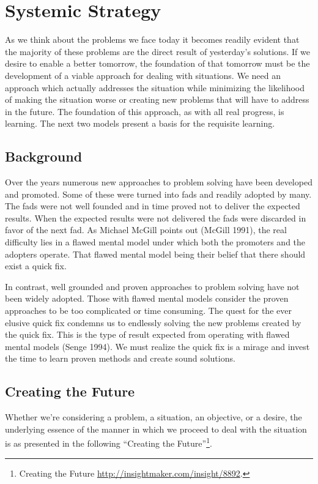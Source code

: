 \documentclass[]{memoir}
\begin{document}
\section{Systemic Strategy}

As we think about the problems we face today it becomes readily evident
that the majority of these problems are the direct result of yesterday's
solutions. If we desire to enable a better tomorrow, the foundation of
that tomorrow must be the development of a viable approach for dealing
with situations. We need an approach which actually addresses the
situation while minimizing the likelihood of making the situation worse
or creating new problems that will have to address in the future. The
foundation of this approach, as with all real progress, is learning. The
next two models present a basis for the requisite learning.

\subsection{Background}

Over the years numerous new approaches to problem solving have been
developed and promoted. Some of these were turned into fads and readily
adopted by many. The fads were not well founded and in time proved not
to deliver the expected results. When the expected results were not
delivered the fads were discarded in favor of the next fad. As Michael
McGill points out (McGill 1991), the real difficulty lies in a flawed
mental model under which both the promoters and the adopters operate.
That flawed mental model being their belief that there should exist a
quick fix.

In contrast, well grounded and proven approaches to problem solving have
not been widely adopted. Those with flawed mental models consider the
proven approaches to be too complicated or time consuming. The quest for
the ever elusive quick fix condemns us to endlessly solving the new
problems created by the quick fix. This is the type of result expected
from operating with flawed mental models (Senge 1994). We must realize
the quick fix is a mirage and invest the time to learn proven methods
and create sound solutions.

\subsection{Creating the Future}

Whether we're considering a problem, a situation, an objective, or a
desire, the underlying essence of the manner in which we proceed to deal
with the situation is as presented in the following ``Creating the
Future''\footnote{Creating the Future
  \url{http://insightmaker.com/insight/8892}.}.
\end{document}
